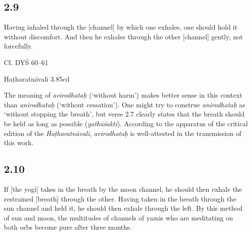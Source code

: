 \begin{ekdosis}
\subsection*{2.9}
\begin{translation}[hp02_009]
Having inhaled through the [channel] by which one exhales, one should hold it without discomfort. And then he exhales through the other [channel] gently, not forcefully.
\end{translation}

\begin{sources}[hp02_009]
Cf. DYŚ 60--61

\begin{versinnote}
\end{versinnote}
\end{sources}

\begin{testimonia}[hp02_009]
Haṭharatnāvalī 3.85cd%

\begin{versinnote}
\end{versinnote}
\end{testimonia}

\begin{philcomm}[hp02_009]
The meaning of \emph{avirodhataḥ} (‘without harm’) makes better sense in this context than \emph{anirodhataḥ} (‘without cessation’). One might try to construe \emph{anirodhataḥ} as ‘without stopping the breath’, but verse 2.7 clearly states that the breath should be held as long as possible (\emph{yathāśakti}). According to the apparatus of the critical edition of the \emph{Haṭharatnāvalī}, \emph{avirodhataḥ} is well-attested in the transmission of this work.
\end{philcomm}

\subsection*{2.10}
\begin{translation}[hp02_010]
If [the yogi] takes in the breath by the moon channel, he should then exhale the restrained [breath] through the other. Having taken in the breath through the sun channel and held it, he should then exhale through the left. By this method of sun and moon, the multitudes of channels of yamis who are meditating on both orbs become pure after three months.
\end{translation}


\end{ekdosis}
